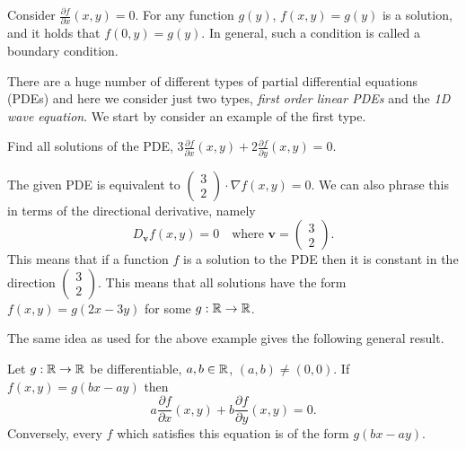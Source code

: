 Consider $\frac{\partial f}{\partial x}(x,y) = 0$. For any function $g(y)$, $f(x,y) = g(y)$ is a solution,
and it holds that $f(0,y) = g(y)$. In general, such a condition is called a boundary condition.


There are a huge number of different types of partial differential equations (PDEs) and here we consider just two types, \emph{first order linear PDEs} and the \emph{1D wave equation}.
We start by consider an example of the first type.

\begin{example*}
    Find all solutions of the PDE,
    \(3 \frac{\partial f}{\partial x}(x,y) + 2 \frac{\partial f}{\partial y} (x,y) = 0\).
\end{example*}

\begin{solution}
    The given PDE is equivalent to
    \(\left( \begin{smallmatrix}
            3 \\ 2
        \end{smallmatrix} \right)
    \cdot
    \nabla f(x,y) =0\).
    We can also phrase this in terms of the directional derivative, namely
    \[
        D_{\mathbf{v}}f(x,y) = 0 \quad \text{where \(\mathbf{v}=\left( \begin{smallmatrix}
                3 \\ 2
            \end{smallmatrix} \right)\)}.
    \]
    This means that if a function \(f\) is a solution to the PDE then it is constant in the direction \(\left( \begin{smallmatrix}
            3 \\ 2
        \end{smallmatrix} \right)\).
    This means that all solutions have the form \(f(x,y) = g(2x-3y)\) for some \(g:\mathbb{R} \to \mathbb{R}\).
\end{solution}

The same idea as used for the above example gives the following general result.

\begin{theorem}
    Let \(g:\mathbb{R}\to\mathbb{R}\) be differentiable, \(a,b\in \mathbb{R}\), \((a,b)\neq (0,0)\).
    If \(f(x,y)= g(bx-ay)\) then
    \[
        a \frac{\partial f}{\partial x} (x,y) + b \frac{\partial f}{\partial y} (x,y) = 0.
    \]
    Conversely, every \(f\) which satisfies this equation is of the form \(g(bx-ay)\).
\end{theorem}

